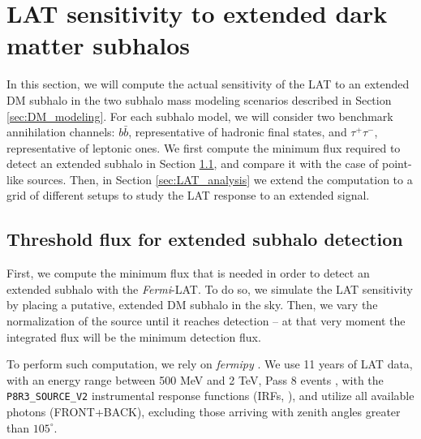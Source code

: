 \documentclass[%
 reprint,
nofootinbib,
 amsmath,amssymb,
 aps,
]{revtex4-2}
\begin{document}
\section{LAT sensitivity to extended dark matter subhalos}
\label{sec:analysis_bigsection}
In this section, we will compute the actual sensitivity of the LAT to an extended DM subhalo in the two subhalo mass modeling scenarios described in Section \ref{sec:DM_modeling}. For each subhalo model, we will consider two benchmark annihilation channels: $b\bar{b}$, representative of hadronic final states, and $\tau^+\tau^-$, representative of leptonic ones. We first compute the minimum flux required to detect an extended subhalo in Section \ref{sec:fmin}, and compare it with the case of point-like sources. Then, in Section \ref{sec:LAT_analysis} we extend the computation to a grid of different setups to study the LAT response to an extended signal. 

\subsection{Threshold flux for extended subhalo detection}
\label{sec:fmin}

First, we compute the minimum flux that is needed in order to detect an extended subhalo with the \textit{Fermi}-LAT. To do so, we simulate the LAT sensitivity by placing a putative, extended DM subhalo in the sky. Then, we vary the normalization of the source until it reaches detection -- at that very moment the integrated flux will be the minimum detection flux.

To perform such computation, we rely on \textit{fermipy} \cite{Wood2017}. We use 11 years of LAT data, with an energy range between 500 MeV and 2 TeV, Pass 8 events \cite{Atwood2013}, with the \texttt{P8R3\_SOURCE\_V2} instrumental response functions (IRFs, \cite{Bruel2018}), and utilize all available photons (FRONT+BACK), excluding those arriving with zenith angles greater than $105^\circ$.
\end{document}
